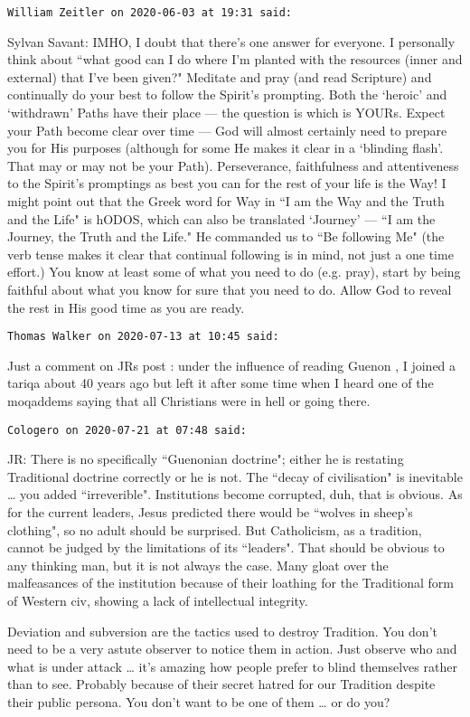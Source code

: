 \begin{footnotesize}
\begin{sffamily}
\hfill

\texttt{William Zeitler on 2020-06-03 at 19:31 said: }

Sylvan Savant: IMHO, I doubt that there's one answer for everyone. I personally think about ``what good can I do where I'm planted with the resources (inner and external) that I've been given?" Meditate and pray (and read Scripture) and continually do your best to follow the Spirit's prompting. Both the `heroic' and `withdrawn' Paths have their place — the question is which is YOURs. Expect your Path become clear over time — God will almost certainly need to prepare you for His purposes (although for some He makes it clear in a `blinding flash'. That may or may not be your Path). Perseverance, faithfulness and attentiveness to the Spirit's promptings as best you can for the rest of your life is the Way! I might point out that the Greek word for Way in ``I am the Way and the Truth and the Life" is hODOS, which can also be translated `Journey’ — ``I am the Journey, the Truth and the Life." He commanded us to ``Be following Me" (the verb tense makes it clear that continual following is in mind, not just a one time effort.) You know at least some of what you need to do (e.g. pray), start by being faithful about what you know for sure that you need to do. Allow God to reveal the rest in His good time as you are ready.


\hfill

\texttt{Thomas Walker on 2020-07-13 at 10:45 said: }

Just a comment on JRs post : under the influence of reading Guenon , I joined a tariqa about 40 years ago but left it after some time when I heard one of the moqaddems saying that all Christians were in hell or going there.


\hfill

\texttt{Cologero on 2020-07-21 at 07:48 said: }

JR: There is no specifically ``Guenonian doctrine"; either he is restating Traditional doctrine correctly or he is not. The ``decay of civilisation" is inevitable … you added ``irreverible". Institutions become corrupted, duh, that is obvious. As for the current leaders, Jesus predicted there would be ``wolves in sheep's clothing", so no adult should be surprised. But Catholicism, as a tradition, cannot be judged by the limitations of its ``leaders". That should be obvious to any thinking man, but it is not always the case. Many gloat over the malfeasances of the institution because of their loathing for the Traditional form of Western civ, showing a lack of intellectual integrity.

Deviation and subversion are the tactics used to destroy Tradition. You don't need to be a very astute observer to notice them in action. Just observe who and what is under attack … it's amazing how people prefer to blind themselves rather than to see. Probably because of their secret hatred for our Tradition despite their public persona. You don't want to be one of them … or do you?


\end{sffamily}\end{footnotesize}
